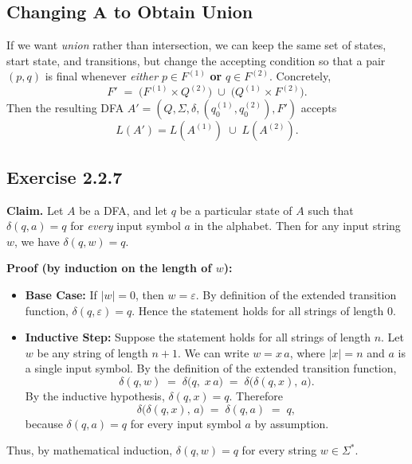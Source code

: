 \documentclass{article}
\theoremstyle{theorem}
\theoremstyle{definition}
\theoremstyle{remark}
\begin{document}
\subsection*{Changing \(\mathbf{A}\) to Obtain Union}

If we want \emph{union} rather than intersection, we can keep the same set of states, start state, and transitions, but change the accepting condition so that a pair \((p,q)\) is final whenever \emph{either} \(p\in F^{(1)}\) \textbf{or} \(q\in F^{(2)}\).  
Concretely,
\[
  F' \;=\; 
    \bigl(F^{(1)}\times Q^{(2)}\bigr) 
    \;\cup\; 
    \bigl(Q^{(1)}\times F^{(2)}\bigr).
\]
Then the resulting DFA \(A' = (Q,\Sigma,\delta,(q_0^{(1)},q_0^{(2)}),F')\) accepts 
\[
  L(A') = L(A^{(1)}) \;\cup\; L(A^{(2)}).
\]

\newpage

\subsection{Exercise 2.2.7}
\noindent
\textbf{Claim.} Let \(A\) be a DFA, and let \(q\) be a particular state of \(A\) such that 
\(\delta(q,a) = q\) for \textit{every} input symbol \(a\) in the alphabet.  
Then for any input string \(w\), we have \(\delta(q,w) = q\).

\bigskip
\noindent
\textbf{Proof (by induction on the length of \(w\)):}

\begin{itemize}
\item \textbf{Base Case:}  
  If \(\lvert w\rvert = 0\), then \(w = \varepsilon\).  
  By definition of the extended transition function, 
  \(\delta(q,\varepsilon) = q\).  
  Hence the statement holds for all strings of length 0.

\item \textbf{Inductive Step:}  
  Suppose the statement holds for all strings of length \(n\).  
  Let \(w\) be any string of length \(n+1\).  
  We can write \(w = x\,a\), where \(\lvert x\rvert = n\) and \(a\) is a single input symbol.  
  By the definition of the extended transition function,
  \[
    \delta(q,w) \;=\; \delta\bigl(q,\;x\,a\bigr) 
                   \;=\; \delta\bigl(\delta(q,x),\,a\bigr).
  \]
  By the inductive hypothesis, \(\delta(q,x) = q\).  
  Therefore
  \[
    \delta\bigl(\delta(q,x),\,a\bigr) 
    \;=\; \delta(q,a) 
    \;=\; q,
  \]
  because \(\delta(q,a) = q\) for every input symbol \(a\) by assumption.
\end{itemize}

\noindent
Thus, by mathematical induction, \(\delta(q,w) = q\) for every string \(w\in\Sigma^*\). 
\qedsymbol
\end{document}
